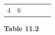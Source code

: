 \begin{enumerate}[noitemsep, label=\textbf{\arabic*}. ]
{\begin{center}
\begin{xtabular*}{\mytablewidth}[t]{|p{10\mystarwidth}|p{10\mystarwidth}|p{10\mystarwidth}|p{10\mystarwidth}|p{10\mystarwidth}|p{10\mystarwidth}|}
    
        4 &
    
    
        6%
     \tabularnewline{}
    \end{xtabular*}
      \end{center}
    \begin{center}{\small\bfseries Table 11.2}\end{center}
    
    \addtocounter{footnote}{-0}
    
        }%
      
    \par
  

\end{enumerate}
